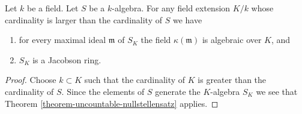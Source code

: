 \begin{lemma}
\label{lemma-base-change-Jacobson}
Let $k$ be a field. Let $S$ be a $k$-algebra.
For any field extension $K/k$ whose cardinality is larger
than the cardinality of $S$ we have
\begin{enumerate}
\item for every maximal ideal $\mathfrak m$ of $S_K$ the field
$\kappa(\mathfrak m)$ is algebraic over $K$, and
\item $S_K$ is a Jacobson ring.
\end{enumerate}
\end{lemma}

\begin{proof}
Choose $k \subset K$ such that the cardinality of $K$ is greater
than the cardinality of $S$. Since the elements of $S$ generate
the $K$-algebra $S_K$ we see that
Theorem \ref{theorem-uncountable-nullstellensatz}
applies.
\end{proof}